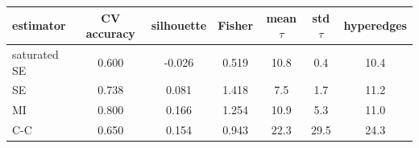 \begin{tabular}{lcccccc}
\toprule
estimator & CV accuracy & silhouette & Fisher & mean $\tau$ & std $\tau$ & hyperedges \\
\midrule
saturated SE & 0.600 & -0.026 & 0.519 & 10.8 & 0.4 & 10.4 \\
SE & 0.738 & 0.081 & 1.418 & 7.5 & 1.7 & 11.2 \\
MI & 0.800 & 0.166 & 1.254 & 10.9 & 5.3 & 11.0 \\
C-C & 0.650 & 0.154 & 0.943 & 22.3 & 29.5 & 24.3 \\
\bottomrule
\end{tabular}
